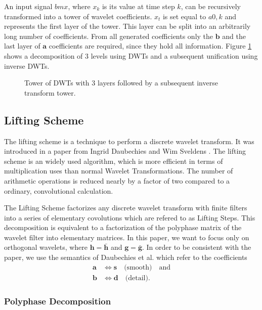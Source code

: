 \begin{refsection}
An input signal $bm x$, where $x_k$ is its value at time step $k$, can be recursively transformed into a tower of wavelet coefficients.
$x_t$ is set equal to $a{0,k}$ and represents the first layer of the tower.
This layer can be split into an arbitrarily long number of coefficients.
From all generated coefficients only the $\bm b$ and the last layer of $\bm a$ coefficients are required, since they hold all information.
Figure \ref{fpga:fig:dwtTower} shows a decomposition of 3 levels using DWTs and a subsequent unification using inverse DWTs.
\begin{figure}
	\centering
	
	\caption{Tower of DWTs with 3 layers followed by a subsequent inverse transform tower.}
	\label{fpga:fig:dwtTower}
\end{figure}


\subsection{Lifting Scheme}

The lifting scheme is a technique to perform a discrete wavelet transform.
It was introduced in a paper from Ingrid Daubechies and Wim Sveldens \cite{fpga:Daubechies1998}. 
The lifting scheme is an widely used algorithm, which is more efficient in terms of multiplication uses than normal Wavelet Transformations.
The number of arithmetic operations is reduced nearly by a factor of two compared to a ordinary, convolutional calculation.

The Lifting Scheme factorizes any discrete wavelet transform with finite filters into a series of elementary covolutions which are refered to as Lifting Steps.
This decomposition is equivalent to a factorization of the polyphase matrix of the wavelet filter into elementary matrices. 
In this paper, we want to focus only on orthogonal wavelets, where $\bm h = \bm{\bar h}$ and $\bm g = \bm{\bar g}$.
In order to be consistent with the paper, we use the semantics of Daubechies et al. which refer to the coefficients
\begin{align}
\bm a & \iff \bm s \quad \text{(smooth)} \quad \text{and} \\
\bm b & \iff \bm d \quad \text{(detail)} .
\end{align}

\subsubsection{Polyphase Decomposition \label{fpga:polyphase}}


\end{refsection}
